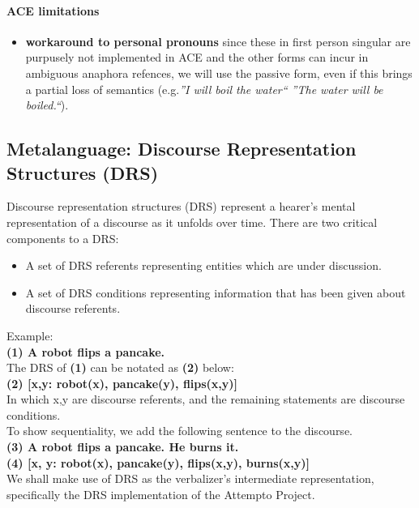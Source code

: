 \documentclass[10pt,a4paper]{article}
\begin{document}
\paragraph{ACE limitations} 

\begin{itemize}
 \item[] \textbf{workaround to personal pronouns} since these in first person singular 
 are purpusely not implemented in ACE and the other forms can incur in ambiguous anaphora 
 refences, we will use the passive form, even if this brings a partial loss of semantics 
 (e.g.\textit{''I will boil the water`` \textrightarrow ''The water will be boiled.``}).
\end{itemize}

\subsection{Metalanguage: Discourse Representation Structures (DRS)} 

Discourse representation structures (DRS) represent a hearer's mental representation 
of a discourse as it unfolds over time. There are two critical components to a DRS:

\begin{itemize}
 \item A set of DRS referents representing entities which are under discussion.
 \item A set of DRS conditions representing information that has been given about discourse 
 referents.
\end{itemize}
Example:\\
\textbf{(1) {\color{Bittersweet} A robot flips a pancake.}}\\
The DRS of \textbf{(1)} can be notated as \textbf{(2)} below:\\
\textbf{(2) {\color{Bittersweet} [x,y: robot(x), pancake(y), flips(x,y)]}}\\

In which x,y are discourse referents, and the remaining statements are discourse conditions.\\
To show sequentiality, we add the following sentence to the discourse.\\
\textbf{(3) {\color{Bittersweet} A robot flips a pancake. He burns it.}}\\
\textbf{(4) {\color{Bittersweet} [x, y: robot(x), pancake(y), flips(x,y), burns(x,y)]}}\\

We shall make use of DRS as the verbalizer's intermediate representation, 
specifically the DRS implementation of the Attempto Project.
\end{document}
